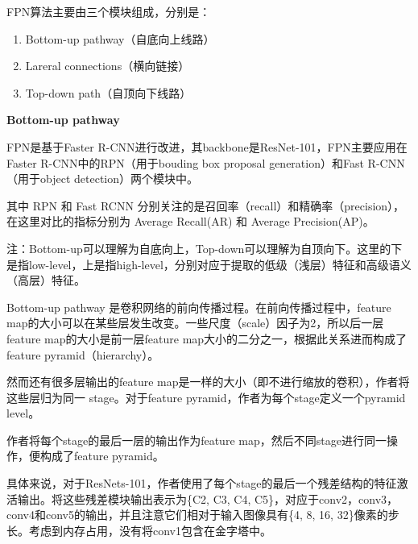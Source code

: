\begin{figure}
\centering
\caption{}
\end{figure}

FPN算法主要由三个模块组成，分别是：

\begin{enumerate}
\def\labelenumi{\arabic{enumi}.}
\item
  Bottom-up pathway（自底向上线路）
\item
  Lareral connections（横向链接）
\item
  Top-down path（自顶向下线路）
\end{enumerate}

\begin{figure}
\centering
\caption{}
\end{figure}

\textbf{Bottom-up pathway}

FPN是基于Faster
R-CNN进行改进，其backbone是ResNet-101，FPN主要应用在Faster
R-CNN中的RPN（用于bouding box proposal generation）和Fast
R-CNN（用于object detection）两个模块中。

其中 RPN 和 Fast RCNN
分别关注的是召回率（recall）和精确率（precision），在这里对比的指标分别为
Average Recall(AR) 和 Average Precision(AP)。

注：Bottom-up可以理解为自底向上，Top-down可以理解为自顶向下。这里的下是指low-level，上是指high-level，分别对应于提取的低级（浅层）特征和高级语义（高层）特征。

Bottom-up pathway 是卷积网络的前向传播过程。在前向传播过程中，feature
map的大小可以在某些层发生改变。一些尺度（scale）因子为2，所以后一层feature
map的大小是前一层feature map大小的二分之一，根据此关系进而构成了feature
pyramid（hierarchy）。

然而还有很多层输出的feature
map是一样的大小（即不进行缩放的卷积），作者将这些层归为同一
stage。对于feature pyramid，作者为每个stage定义一个pyramid level。

作者将每个stage的最后一层的输出作为feature
map，然后不同stage进行同一操作，便构成了feature pyramid。

具体来说，对于ResNets-101，作者使用了每个stage的最后一个残差结构的特征激活输出。将这些残差模块输出表示为\{C2,
C3, C4,
C5\}，对应于conv2，conv3，conv4和conv5的输出，并且注意它们相对于输入图像具有\{4,
8, 16, 32\}像素的步长。考虑到内存占用，没有将conv1包含在金字塔中。

\begin{figure}
\centering
\caption{}
\end{figure}

